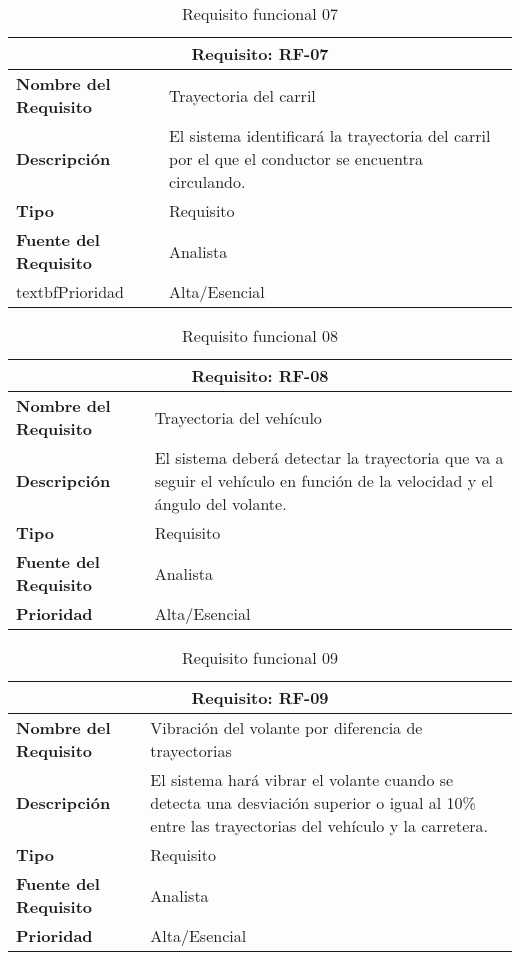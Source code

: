 \begin{table}[H]
\begin{center}
\begin{tabular}{p{} p{7cm}}
\multicolumn{2}{c}{\textbf{Requisito: RF-07} } \\
\hline \hline
\textbf{Nombre del Requisito} & Trayectoria del carril\\
\hline
\textbf{Descripción} & El sistema identificará la trayectoria del carril por el que el conductor se encuentra circulando. \\
\hline
\textbf{Tipo} & Requisito  \\
\hline
\textbf{Fuente del Requisito} & Analista \\
\hline
textbf{Prioridad} & Alta/Esencial  \\ \hline
\end{tabular}
\caption{Requisito funcional 07}
\label{tab:RF-07}
\end{center}
\end{table}

\begin{table}[H]
\begin{center}
\begin{tabular}{p{} p{7cm}}
\multicolumn{2}{c}{\textbf{Requisito: RF-08} } \\
\hline \hline
\textbf{Nombre del Requisito} & Trayectoria del vehículo\\
\hline
\textbf{Descripción} & El sistema deberá detectar la trayectoria que va a seguir el vehículo en función de la velocidad y el ángulo del volante. \\
\hline
\textbf{Tipo} & Requisito  \\
\hline
\textbf{Fuente del Requisito} & Analista \\
\hline
\textbf{Prioridad} & Alta/Esencial  \\ \hline
\end{tabular}
\caption{Requisito funcional 08}
\label{tab:RF-08}
\end{center}
\end{table}

\begin{table}[H]
\begin{center}
\begin{tabular}{p{} p{7cm}}
\multicolumn{2}{c}{\textbf{Requisito: RF-09} } \\
\hline \hline
\textbf{Nombre del Requisito} &  Vibración del volante por diferencia de trayectorias\\
\hline
\textbf{Descripción} & El sistema hará vibrar el volante cuando se detecta una desviación superior o igual al 10\% entre las trayectorias del vehículo y la carretera. \\
\hline
\textbf{Tipo} & Requisito  \\
\hline
\textbf{Fuente del Requisito} & Analista \\
\hline
\textbf{Prioridad} & Alta/Esencial  \\ \hline
\end{tabular}
\caption{Requisito funcional 09}
\label{tab:RF-09}
\end{center}
\end{table}

